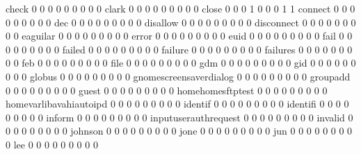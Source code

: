 \documentclass[compress,8pt]{beamer}
\begin{document}
\begin{frame}
\begin{Schunk}
  check                                      0   0   0   0   0   0   0   0   0
  clark                                      0   0   0   0   0   0   0   0   0
  close                                      0   0   0   1   0   0   0   1   1
  connect                                    0   0   0   0   0   0   0   0   0
  dec                                        0   0   0   0   0   0   0   0   0
  disallow                                   0   0   0   0   0   0   0   0   0
  disconnect                                 0   0   0   0   0   0   0   0   0
  eaguilar                                   0   0   0   0   0   0   0   0   0
  error                                      0   0   0   0   0   0   0   0   0
  euid                                       0   0   0   0   0   0   0   0   0
  fail                                       0   0   0   0   0   0   0   0   0
  failed                                     0   0   0   0   0   0   0   0   0
  failure                                    0   0   0   0   0   0   0   0   0
  failures                                   0   0   0   0   0   0   0   0   0
  feb                                        0   0   0   0   0   0   0   0   0
  file                                       0   0   0   0   0   0   0   0   0
  gdm                                        0   0   0   0   0   0   0   0   0
  gid                                        0   0   0   0   0   0   0   0   0
  globus                                     0   0   0   0   0   0   0   0   0
  gnomescreensaverdialog                     0   0   0   0   0   0   0   0   0
  groupadd                                   0   0   0   0   0   0   0   0   0
  guest                                      0   0   0   0   0   0   0   0   0
  homehomesftptest                           0   0   0   0   0   0   0   0   0
  homevarlibavahiautoipd                     0   0   0   0   0   0   0   0   0
  identif                                    0   0   0   0   0   0   0   0   0
  identifi                                   0   0   0   0   0   0   0   0   0
  inform                                     0   0   0   0   0   0   0   0   0
  inputuserauthrequest                       0   0   0   0   0   0   0   0   0
  invalid                                    0   0   0   0   0   0   0   0   0
  johnson                                    0   0   0   0   0   0   0   0   0
  jone                                       0   0   0   0   0   0   0   0   0
  jun                                        0   0   0   0   0   0   0   0   0
  lee                                        0   0   0   0   0   0   0   0   0

\end{Schunk}
\end{frame}
\end{document}
